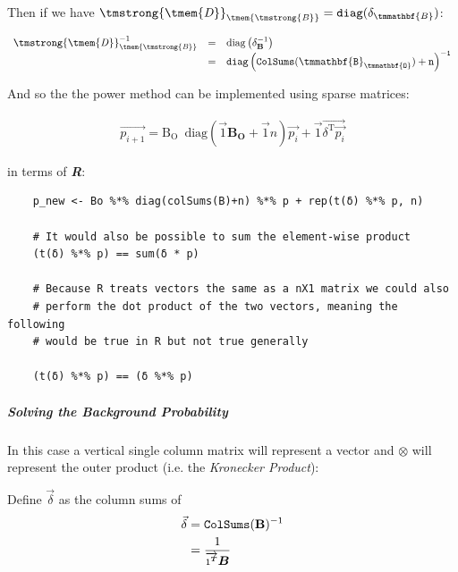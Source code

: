 \documentclass[11pt]{report}
\begin{document}
Then if we have \(\mathit{{\tmstrong{{\tmem{D}}}}}_{\mathit{{\tmem{{\tmstrong{B}}}}}} =
\mathtt{diag} (\delta_{\tmmathbf{B}}) \mathtt{}\):


\[ \begin{array}{lll}
     \mathit{{\tmstrong{{\tmem{D}}}}}_{\mathit{{\tmem{{\tmstrong{B}}}}}}^{- 1}
     & = & \mathrm{diag} \left( \delta^{- 1}_{\mathbf{B}} \right)\\
     & = & \mathtt{diag} \left( \mathtt{ColSums}
     (\mathtt{\tmmathbf{B}_{\tmmathbf{O}}}) + \mathtt{n}
     \right)^{\mathtt{- 1}}
   \end{array} \]

And so the the power method can be implemented using sparse matrices:

\begin{align}
\vec{p_{i+1}} = \mathrm{B_{O}} \enspace \mathrm{diag}\left( \vec{1} \mathbf{B_{O}} + \vec{1}n \right) \vec{p_{i}} + \vec{1} \vec{\delta^{\mathrm{T}}\vec{p_{i}}}
\end{align}

in terms of \textbf{\emph{R}}:

\begin{tcolorbox}
    \begin{verbatim}
    p_new <- Bo %*% diag(colSums(B)+n) %*% p + rep(t(δ) %*% p, n)

    # It would also be possible to sum the element-wise product
    (t(δ) %*% p) == sum(δ * p)

    # Because R treats vectors the same as a nX1 matrix we could also
    # perform the dot product of the two vectors, meaning the following
    # would be true in R but not true generally

    (t(δ) %*% p) == (δ %*% p)
    \end{verbatim}
\end{tcolorbox}

\subparagraph{Solving the Background Probability}
\label{solve-background-prob-power-walk-sparse}
In this case a vertical single column matrix will represent a vector and \(\otimes\) will represent the outer product (i.e. the \emph{Kronecker Product}):



Define \(\vec{\delta}\) as the column sums of
\[\begin{aligned}
     \vec{\delta} & = \mathtt{ColSums} (\text{{\bfseries{B}}})^{- 1}\\
     & = \frac{1}{\overrightarrow{1^{{\scriptsize \ensuremath{\boldsymbol{T}}}}}
     \ensuremath{\boldsymbol{B}}}
   \end{aligned}\]
\end{document}
